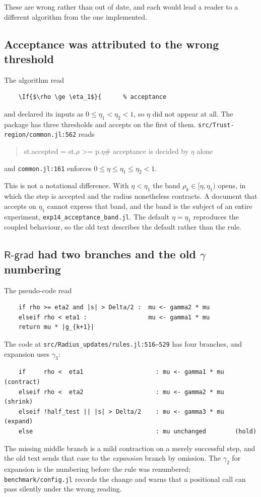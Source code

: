 \documentclass[11pt,a4paper]{article}
\providecommand{\Rgrad}{\textsf{R-grad}}
\begin{document}
These are wrong rather than out of date, and each would lead a reader to a
different algorithm from the one implemented.

\subsection{Acceptance was attributed to the wrong threshold}

The algorithm read
\begin{verbatim}
    \If{$\rho \ge \eta_1$}{      % acceptance
\end{verbatim}
and declared its inputs as $0 \le \eta_1 < \eta_2 < 1$, so $\eta$ did not appear
at all. The package has three thresholds and accepts on the first of them.
\texttt{src/Trust-region/common.jl:562} reads
\begin{quote}\ttfamily\small
st.accepted = st.$\rho$ >= p.$\eta$\qquad\# acceptance is decided by
$\eta$ alone
\end{quote}
and \texttt{common.jl:161} enforces $0 \le \eta \le \eta_1 \le \eta_2 < 1$.

This is not a notational difference. With $\eta < \eta_1$ the band
$\rho_k \in [\eta, \eta_1)$ opens, in which the step is accepted and the radius
nonetheless contracts. A document that accepts on $\eta_1$ cannot express that
band, and the band is the subject of an entire experiment,
\texttt{exp14\_acceptance\_band.jl}. The default $\eta = \eta_1$ reproduces the
coupled behaviour, so the old text describes the default rather than the rule.

\subsection{\texorpdfstring{$\Rgrad$}{R-grad} had two branches and the old
\texorpdfstring{$\gamma$}{gamma} numbering}

The pseudo-code read
\begin{verbatim}
    if rho >= eta2 and |s| > Delta/2 :  mu <- gamma2 * mu
    elseif rho < eta1 :                 mu <- gamma1 * mu
    return mu * |g_{k+1}|
\end{verbatim}
The code at \texttt{src/Radius\_updates/rules.jl:516--529} has four branches, and
expansion uses $\gamma_3$:
\begin{verbatim}
    if     rho <  eta1                    : mu <- gamma1 * mu   (contract)
    elseif rho <  eta2                    : mu <- gamma2 * mu   (shrink)
    elseif !half_test || |s| > Delta/2    : mu <- gamma3 * mu   (expand)
    else                                  : mu unchanged        (hold)
\end{verbatim}
The missing middle branch is a mild contraction on a merely successful step, and
the old text sends that case to the \emph{expansion} branch by omission. The
$\gamma_2$ for expansion is the numbering before the rule was renumbered;
\texttt{benchmark/config.jl} records the change and warns that a positional call
can pass silently under the wrong reading.
\end{document}
